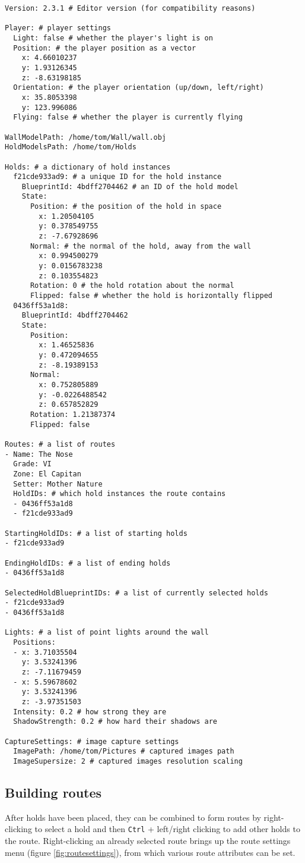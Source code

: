 \begin{verbatim}
Version: 2.3.1 # Editor version (for compatibility reasons)

Player: # player settings
  Light: false # whether the player's light is on
  Position: # the player position as a vector
    x: 4.66010237
    y: 1.93126345
    z: -8.63198185
  Orientation: # the player orientation (up/down, left/right)
    x: 35.8053398
    y: 123.996086
  Flying: false # whether the player is currently flying

WallModelPath: /home/tom/Wall/wall.obj
HoldModelsPath: /home/tom/Holds

Holds: # a dictionary of hold instances
  f21cde933ad9: # a unique ID for the hold instance
    BlueprintId: 4bdff2704462 # an ID of the hold model
    State:
      Position: # the position of the hold in space
        x: 1.20504105
        y: 0.378549755
        z: -7.67928696
      Normal: # the normal of the hold, away from the wall
        x: 0.994500279
        y: 0.0156783238
        z: 0.103554823
      Rotation: 0 # the hold rotation about the normal
      Flipped: false # whether the hold is horizontally flipped
  0436ff53a1d8:
    BlueprintId: 4bdff2704462
    State:
      Position:
        x: 1.46525836
        y: 0.472094655
        z: -8.19389153
      Normal:
        x: 0.752805889
        y: -0.0226488542
        z: 0.657852829
      Rotation: 1.21387374
      Flipped: false

Routes: # a list of routes
- Name: The Nose
  Grade: VI
  Zone: El Capitan
  Setter: Mother Nature
  HoldIDs: # which hold instances the route contains
  - 0436ff53a1d8
  - f21cde933ad9

StartingHoldIDs: # a list of starting holds
- f21cde933ad9

EndingHoldIDs: # a list of ending holds
- 0436ff53a1d8

SelectedHoldBlueprintIDs: # a list of currently selected holds
- f21cde933ad9
- 0436ff53a1d8

Lights: # a list of point lights around the wall
  Positions:
  - x: 3.71035504
    y: 3.53241396
    z: -7.11679459
  - x: 5.59678602
    y: 3.53241396
    z: -3.97351503
  Intensity: 0.2 # how strong they are
  ShadowStrength: 0.2 # how hard their shadows are

CaptureSettings: # image capture settings
  ImagePath: /home/tom/Pictures # captured images path
  ImageSupersize: 2 # captured images resolution scaling
\end{verbatim}

\subsection{Building routes}
After holds have been placed, they can be combined to form routes by right-clicking to select a hold and then \verb|Ctrl| + left/right clicking to add other holds to the route.
Right-clicking an already selected route brings up the route settings menu (figure \ref{fig:routesettings}), from which various route attributes can be set.

